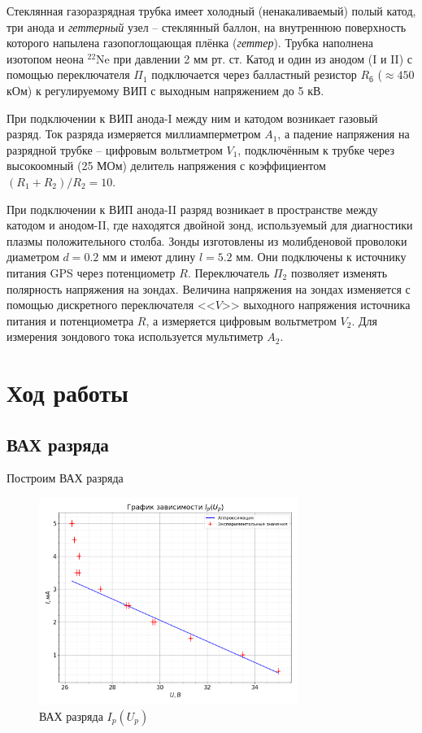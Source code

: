 \documentclass[a4paper, 12pt]{article}
\begin{document}
        Стеклянная газоразрядная трубка имеет холодный (ненакаливаемый) полый катод, три анода и \textit{геттерный} узел -- стеклянный баллон, на внутреннюю поверхность которого напылена газопоглощающая плёнка (\textit{геттер}). Трубка наполнена изотопом неона $^22$Ne при давлении 2 мм рт. ст. Катод и один из анодом (I и II) с помощью переключателя $\Pi_1$ подключается через балластный резистор $R_\text{б}$ ($\approx 450$ кОм) к регулируемому ВИП с выходным напряжением до 5 кВ.

        При подключении к ВИП анода-I между ним и катодом возникает газовый разряд. Ток разряда измеряется миллиамперметром $A_1$, а падение напряжения на разрядной трубке -- цифровым вольтметром $V_1$, подключённым к трубке через высокоомный (25 МОм) делитель напряжения с коэффициентом $(R_1+R_2)/R_2 = 10$.

        При подключении к ВИП анода-II разряд возникает в пространстве между катодом и анодом-II, где находятся двойной зонд, используемый для диагностики плазмы положительного столба. Зонды изготовлены из молибденовой проволоки диаметром $d = 0.2$ мм и имеют длину $l = 5.2$ мм. Они подключены к источнику питания GPS через потенциометр $R$. Переключатель $\Pi_2$ позволяет изменять полярность напряжения на зондах. Величина напряжения на зондах изменяется с помощью дискретного переключателя <<$V$>> выходного напряжения источника питания и потенциометра $R$, а измеряется цифровым вольтметром $V_2$. Для измерения зондового тока используется мультиметр $A_2$.

    \section{Ход работы}

        \subsection{ВАХ разряда}

            Построим ВАХ разряда

            \begin{figure}[!ht]
                \centering
                \includegraphics[width=0.75\textwidth]{img/vah_plazma.png}
                \caption{ВАХ разряда $I_p(U_p)$}
                \label{plot:vah_plazma}
            \end{figure}
\end{document}
